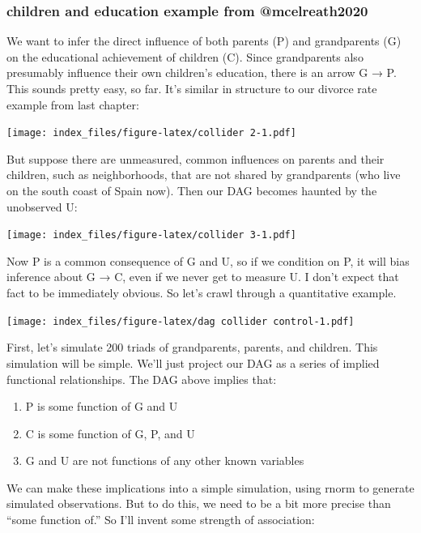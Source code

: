 \documentclass[
]{article}
\begin{document}
\hypertarget{children-and-education-example-from-mcelreath2020}{%
\subsubsection{children and education example from
@mcelreath2020}\label{children-and-education-example-from-mcelreath2020}}

We want to infer the direct influence of both parents (P) and
grandparents (G) on the educational achievement of children (C). Since
grandparents also presumably influence their own children's education,
there is an arrow G → P. This sounds pretty easy, so far. It's similar
in structure to our divorce rate example from last chapter:

\texttt{[image: index\_files/figure-latex/collider 2-1.pdf]}

But suppose there are unmeasured, common influences on parents and their
children, such as neighborhoods, that are not shared by grandparents
(who live on the south coast of Spain now). Then our DAG becomes haunted
by the unobserved U:

\texttt{[image: index\_files/figure-latex/collider 3-1.pdf]}

Now P is a common consequence of G and U, so if we condition on P, it
will bias inference about G → C, even if we never get to measure U. I
don't expect that fact to be immediately obvious. So let's crawl through
a quantitative example.

\texttt{[image: index\_files/figure-latex/dag collider control-1.pdf]}

First, let's simulate 200 triads of grandparents, parents, and children.
This simulation will be simple. We'll just project our DAG as a series
of implied functional relationships. The DAG above implies that:

\begin{enumerate}
\def\labelenumi{(\arabic{enumi})}
\item
  P is some function of G and U
\item
  C is some function of G, P, and U
\item
  G and U are not functions of any other known variables
\end{enumerate}

We can make these implications into a simple simulation, using rnorm to
generate simulated observations. But to do this, we need to be a bit
more precise than ``some function of.'' So I'll invent some strength of
association:
\end{document}
